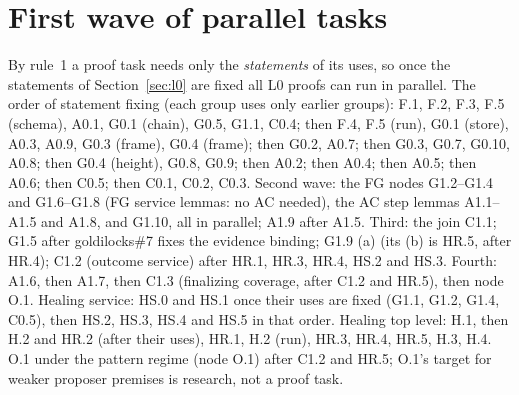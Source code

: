 \documentclass{article}
\begin{document}
\section{First wave of parallel tasks}\label{sec:wave}

By rule~1 a proof task needs only the \emph{statements} of its uses, so once
the statements of Section~\ref{sec:l0} are fixed all L0 proofs can run in
parallel.  The order of statement fixing (each group uses only earlier
groups): F.1, F.2, F.3, F.5 (schema), A0.1, G0.1 (chain), G0.5, G1.1, C0.4; then F.4, F.5 (run), G0.1 (store), A0.3,
A0.9, G0.3 (frame), G0.4 (frame); then G0.2, A0.7; then G0.3, G0.7, G0.10, A0.8;
then G0.4 (height), G0.8, G0.9; then A0.2; then A0.4; then A0.5; then
A0.6; then C0.5; then C0.1, C0.2, C0.3.  Second wave: the FG nodes
G1.2--G1.4 and G1.6--G1.8 (FG service lemmas: no AC needed), the AC step
lemmas A1.1--A1.5 and A1.8, and G1.10, all in parallel; A1.9 after
A1.5.  Third: the join C1.1; G1.5 after goldilocks\#7 fixes the evidence
binding; G1.9 (a) (its (b) is HR.5, after HR.4); C1.2 (outcome service) after HR.1,
HR.3, HR.4, HS.2 and HS.3.
Fourth: A1.6, then A1.7, then C1.3 (finalizing coverage, after C1.2 and HR.5), then
node O.1.  Healing service: HS.0 and HS.1 once their uses
are fixed (G1.1, G1.2, G1.4, C0.5), then HS.2, HS.3, HS.4 and HS.5 in that
order.  Healing top level: H.1, then H.2 and HR.2 (after their uses), HR.1,
H.2 (run), HR.3, HR.4, HR.5, H.3, H.4.
O.1 under the pattern regime (node O.1) after C1.2 and HR.5; O.1's target
for weaker proposer premises is research, not a proof task.
\end{document}
